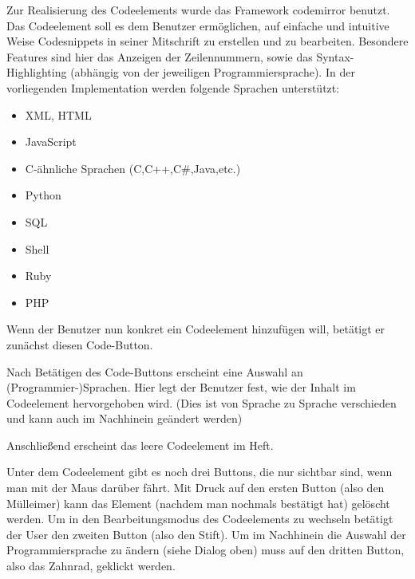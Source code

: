 
Zur Realisierung des Codeelements wurde das Framework codemirror \cite{CODEM} benutzt. Das Codeelement soll es dem Benutzer ermöglichen, auf einfache und intuitive Weise Codesnippets in seiner Mitschrift zu erstellen und zu bearbeiten. Besondere Features sind hier das Anzeigen der Zeilennummern, sowie das Syntax-Highlighting (abhängig von der jeweiligen Programmiersprache). In der vorliegenden Implementation werden folgende Sprachen unterstützt:
\begin{itemize}
\item XML, HTML
\item JavaScript
\item C-ähnliche Sprachen (C,C++,C\#,Java,etc.)
\item Python
\item SQL
\item Shell
\item Ruby
\item PHP
\end{itemize}

Wenn der Benutzer nun konkret ein Codeelement hinzufügen will, betätigt er zunächst diesen Code-Button.


\newpage

Nach Betätigen des Code-Buttons erscheint eine Auswahl an (Programmier-)Sprachen. Hier legt der Benutzer fest, wie der Inhalt im Codeelement hervorgehoben wird. (Dies ist von Sprache zu Sprache verschieden und kann auch im Nachhinein geändert werden)


Anschließend erscheint das leere Codeelement im Heft.


Unter dem Codeelement gibt es noch drei Buttons, die nur sichtbar sind, wenn man mit der Maus darüber fährt. Mit Druck auf den ersten Button (also den Mülleimer) kann das Element (nachdem man nochmals bestätigt hat) gelöscht werden. Um in den Bearbeitungsmodus des Codeelements zu wechseln betätigt der User den zweiten Button (also den Stift). Um im Nachhinein die Auswahl der Programmiersprache zu ändern (siehe Dialog oben) muss auf den dritten Button, also das Zahnrad, geklickt werden.

